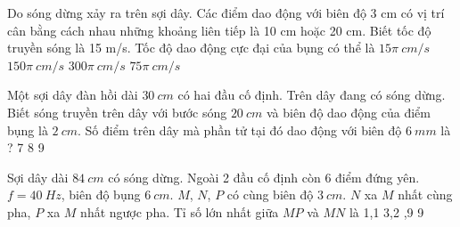 \begin{ex}%
Do sóng dừng xảy ra trên sợi dây. Các điểm dao động với biên độ 3 cm có vị trí cân bằng cách nhau những khoảng liên tiếp là 10 cm hoặc 20 cm. Biết tốc độ truyền sóng là 15 m/s. Tốc độ dao động cực đại của bụng có thể là
\choice
{$15\pi\ cm/s$}
{$150\pi\ cm/s$}
{\True $300\pi\ cm/s$}
{$75\pi\ cm/s$}

\end{ex} 
\begin{ex}
Một sợi dây đàn hồi dài $30\ cm$ có hai đầu cố định. Trên dây đang có sóng dừng. Biết sóng truyền trên dây với bước sóng $20\ cm$ và biên độ dao động của điểm bụng là $2\ cm$. Số điểm trên dây mà phần tử tại đó dao động với biên độ $6\ mm$ là ?
\choice
{}
{7}
{8}
{9}
\loigiai{}
\end{ex}
\begin{ex}
Sợi dây dài $84\ cm$ có sóng dừng. Ngoài 2 đầu cố định còn 6 điểm đứng yên. $f = 40\ Hz$, biên độ bụng $6\ cm$. $M$, $N$, $P$ có cùng biên độ $3\ cm$. $N$ xa $M$ nhất cùng pha, $P$ xa $M$ nhất ngược pha. Tỉ số lớn nhất giữa $MP$ và $MN$ là
\choice 
{1,1}
{3,2}
{,9}
{9}
\end{ex}

